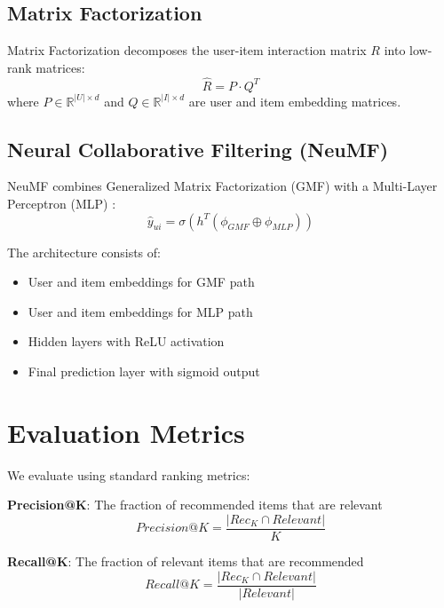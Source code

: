 \subsection{Matrix Factorization}

Matrix Factorization decomposes the user-item interaction matrix $R$ into low-rank matrices:
\begin{equation}
    \hat{R} = P \cdot Q^T
\end{equation}
where $P \in \mathbb{R}^{|U| \times d}$ and $Q \in \mathbb{R}^{|I| \times d}$ are user and item embedding matrices.

\subsection{Neural Collaborative Filtering (NeuMF)}

NeuMF combines Generalized Matrix Factorization (GMF) with a Multi-Layer Perceptron (MLP) \cite{he2017neural}:
\begin{equation}
    \hat{y}_{ui} = \sigma(h^T(\phi_{GMF} \oplus \phi_{MLP}))
\end{equation}

The architecture consists of:
\begin{itemize}
    \item User and item embeddings for GMF path
    \item User and item embeddings for MLP path
    \item Hidden layers with ReLU activation
    \item Final prediction layer with sigmoid output
\end{itemize}

\section{Evaluation Metrics}

We evaluate using standard ranking metrics:

\textbf{Precision@K}: The fraction of recommended items that are relevant
\begin{equation}
    Precision@K = \frac{|Rec_K \cap Relevant|}{K}
\end{equation}

\textbf{Recall@K}: The fraction of relevant items that are recommended
\begin{equation}
    Recall@K = \frac{|Rec_K \cap Relevant|}{|Relevant|}
\end{equation}

